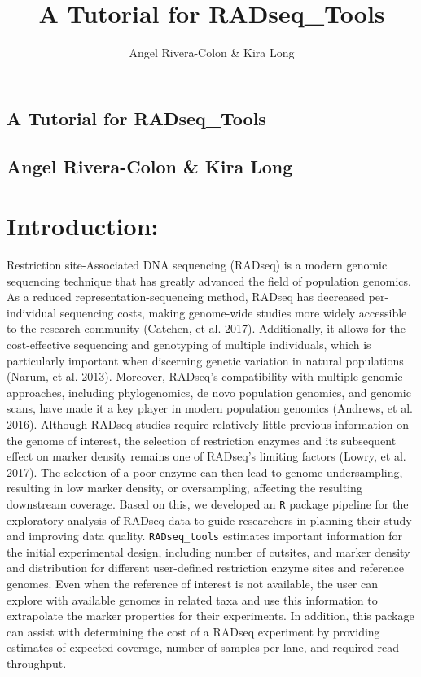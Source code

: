 \documentclass{article}
\title{A Tutorial for RADseq_Tools}
\author{Angel Rivera-Colon & Kira Long}
\begin{document}



\begin{center}
\section*{\huge A Tutorial for RADseq\_Tools}
\subsection*{\Large Angel Rivera-Colon \& Kira Long}
\end{center}


\section{Introduction:}

Restriction site-Associated DNA sequencing (RADseq) is a modern genomic sequencing technique that has greatly advanced the field of population genomics. As a reduced representation-sequencing method, RADseq has decreased per-individual sequencing costs, making genome-wide studies more widely accessible to the research community (Catchen, et al. 2017). Additionally, it allows for the cost-effective sequencing and genotyping of multiple individuals, which is particularly important when discerning genetic variation in natural populations (Narum, et al. 2013). Moreover, RADseq’s compatibility with multiple genomic approaches, including phylogenomics, de novo population genomics, and genomic scans, have made it a key player in modern population genomics (Andrews, et al. 2016).
\bigbreak
Although RADseq studies require relatively little previous information on the genome of interest, the selection of restriction enzymes and its subsequent effect on marker density remains one of RADseq’s limiting factors (Lowry, et al. 2017). The selection of a poor enzyme can then lead to genome undersampling, resulting in low marker density, or oversampling, affecting the resulting downstream coverage. Based on this, we developed an \texttt{R} package pipeline for the exploratory analysis of RADseq data to guide researchers in planning their study and improving data quality. \texttt{RADseq\_tools} estimates important information for the initial experimental design, including number of cutsites, and marker density and distribution for different user-defined restriction enzyme sites and reference genomes. Even when the reference of interest is not available, the user can explore with available genomes in related taxa and use this information to extrapolate the marker properties for their experiments. In addition, this package can assist with determining the cost of a RADseq experiment by providing estimates of expected coverage, number of samples per lane, and required read throughput. 
\end{document}
